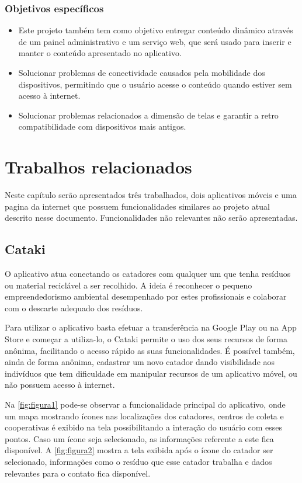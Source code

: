\documentclass[
	12pt,				%
	openright,			%
	twoside,			%
	a4paper,			%
	english,			%
	french,				%
	spanish,			%
	brazil				%
	]{abntex2}
\begin{document}
\subsection{Objetivos específicos}
\begin{itemize}
	\item Este projeto também tem como objetivo entregar conteúdo dinâmico através de um painel administrativo e um serviço web, que será usado para inserir e manter o conteúdo apresentado no aplicativo.
    \item Solucionar problemas de conectividade causados pela mobilidade dos dispositivos, permitindo que o usuário acesse o conteúdo quando estiver sem acesso à internet.
        \item Solucionar problemas relacionados a dimensão de telas e garantir a retro compatibilidade com dispositivos mais antigos.
\end{itemize}

\chapter{Trabalhos relacionados}

Neste capítulo serão apresentados três trabalhados, dois aplicativos móveis e uma pagina da internet que possuem funcionalidades similares ao projeto atual descrito nesse documento. Funcionalidades não relevantes não serão apresentadas.

\section{Cataki}
O aplicativo atua conectando os catadores com qualquer um que tenha resíduos ou material reciclável a ser recolhido. A ideia é reconhecer o pequeno empreendedorismo ambiental desempenhado por estes profissionais e colaborar com o descarte adequado dos resíduos.

Para utilizar o aplicativo basta efetuar a transferência na Google Play\cite{googleplay} ou na App Store\cite{appstore} e começar a utiliza-lo, o Cataki permite o uso dos seus recursos de forma anônima, facilitando o acesso rápido as suas funcionalidades. É possível também, ainda de forma anônima, cadastrar um novo catador dando visibilidade aos indivíduos que tem dificuldade em manipular recursos de um aplicativo móvel, ou não possuem acesso à internet.

Na \autoref{fig:figura1} pode-se observar a funcionalidade principal do aplicativo, onde um mapa mostrando ícones nas localizações dos catadores, centros de coleta e cooperativas é exibido na tela possibilitando a interação do usuário com esses pontos. Caso um ícone seja selecionado, as informações referente a este fica disponível. A \autoref{fig:figura2} mostra a tela exibida após o ícone do catador ser selecionado, informações como o resíduo que esse catador trabalha e dados relevantes para o contato fica disponível. 
    
\end{document}
